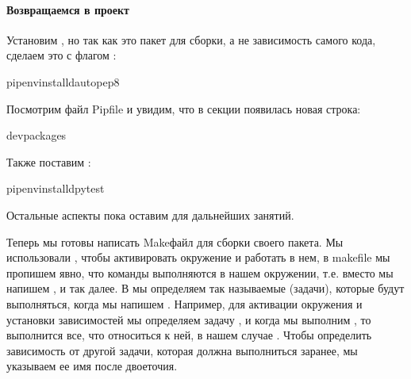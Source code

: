 \documentclass[letterpaper,10pt,russian]{sphinxmanual}
\begin{document}
\paragraph{Возвращаемся в проект}
\label{\detokenize{educational_materials/packaging/content:id4}}
\sphinxAtStartPar
Установим , но так как это пакет для сборки, а не зависимость самого кода, сделаем это с флагом :

\begin{sphinxVerbatim}[commandchars=\\\{\}]
pipenvinstall\PYGZhy{}dautopep8
\end{sphinxVerbatim}

\sphinxAtStartPar
Посмотрим файл Pipfile и увидим, что в секции  появилась новая строка:

\begin{sphinxVerbatim}[commandchars=\\\{\}]
\PYG{o}{[}dev\PYGZhy{}packages\PYG{o}{]}
\end{sphinxVerbatim}

\sphinxAtStartPar
Также поставим :

\begin{sphinxVerbatim}[commandchars=\\\{\}]
pipenvinstall\PYGZhy{}dpytest
\end{sphinxVerbatim}

\sphinxAtStartPar
Остальные аспекты пока оставим для дальнейших занятий.

\sphinxAtStartPar
Теперь мы готовы написать Make\sphinxhyphen{}файл для сборки своего пакета. Мы использовали , чтобы активировать окружение и работать в нем, в makefile мы пропишем явно, что команды выполняются в нашем окружении, т.е. вместо  мы напишем , и так далее. В  мы определяем так называемые  (задачи), которые будут выполняться, когда мы напишем . Например, для активации окружения и установки зависимостей мы определяем задачу , и когда мы выполним , то выполнится все, что относиться к ней, в нашем случае . Чтобы определить зависимость от другой задачи, которая должна выполниться заранее, мы указываем ее имя после двоеточия.
\end{document}
